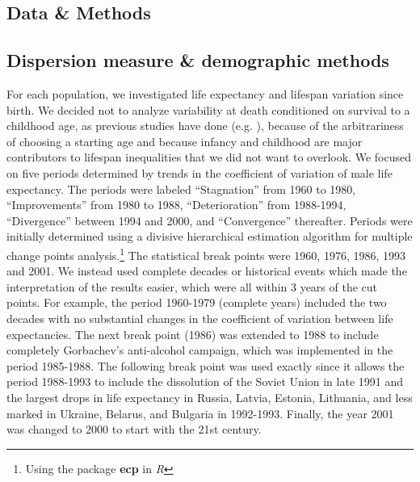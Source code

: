\documentclass{article}
\begin{document}
\begin{spacing}{1.5}
\section*{Data \& Methods}

\subsection*{Dispersion measure \& demographic methods}

For each population, we investigated life expectancy and lifespan variation since birth. We decided not to analyze variability at death conditioned on survival to a childhood age, as previous studies have done (e.g. \citet{edwards2005, smits2009}), because of the arbitrariness of choosing a starting age and because infancy and childhood are major contributors to lifespan inequalities that we did not want to overlook.\textcolor[rgb]{1,0,0}{ We focused on five periods determined by trends in the coefficient of variation of male life expectancy. The periods were labeled ``Stagnation'' from 1960 to 1980, ``Improvements'' from 1980 to 1988, ``Deterioration'' from 1988-1994, ``Divergence'' between 1994 and 2000, and ``Convergence'' thereafter. Periods were initially determined using a divisive hierarchical estimation algorithm for multiple change points analysis.\footnote{Using the package \textbf{ecp} in \textit{R}} The statistical break points were 1960, 1976, 1986, 1993 and 2001. We instead used complete decades or historical events which made the interpretation of the results easier, which were all within 3 years of the cut points. For example, the period 1960-1979 (complete years) included the two decades with no substantial changes in the coefficient of variation between life expectancies. The next break point (1986) was extended to 1988 to include completely Gorbachev’s anti-alcohol campaign, which was implemented in the period 1985-1988. The following break point was used exactly since it allows the period 1988-1993 to include the dissolution of the Soviet Union in late 1991 and the largest drops in life expectancy in Russia, Latvia, Estonia, Lithuania, and less marked in Ukraine, Belarus, and Bulgaria in 1992-1993. Finally, the year 2001 was changed to 2000 to start with the 21st century.}



\end{spacing}
\end{document}

